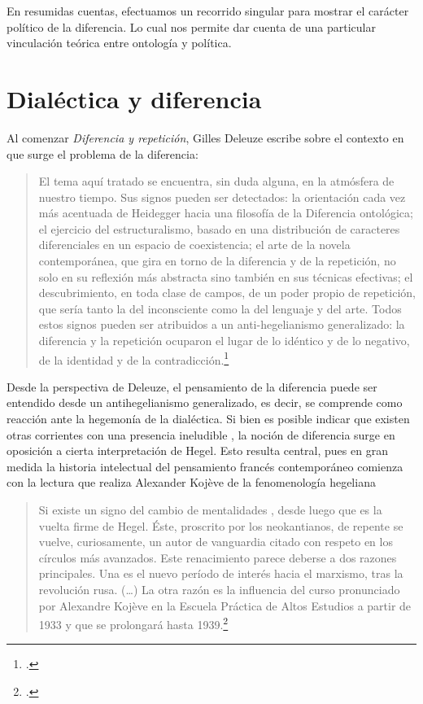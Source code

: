 En resumidas cuentas, efectuamos un recorrido singular para mostrar el carácter político de la diferencia. Lo cual nos permite dar cuenta de una particular vinculación teórica entre ontología y política.


\section{Dialéctica y diferencia}


Al comenzar \emph{Diferencia y repetición}, Gilles Deleuze escribe sobre el contexto en que surge el problema de la diferencia:

\begin{quote}
El tema aquí tratado se encuentra, sin duda alguna, en la atmósfera de nuestro tiempo. Sus signos pueden ser detectados: la orientación cada vez más acentuada de Heidegger hacia una filosofía de la Diferencia ontológica; el ejercicio del estructuralismo, basado en una distribución de caracteres diferenciales en un espacio de coexistencia; el arte de la novela contemporánea, que gira en torno de la diferencia y de la repetición, no solo en su reflexión más abstracta sino también en sus técnicas efectivas; el descubrimiento, en toda clase de campos, de un poder propio de repetición, que sería tanto la del inconsciente como la del lenguaje y del arte. Todos estos signos pueden ser atribuidos a un anti-hegelianismo generalizado: la diferencia y la repetición ocuparon el lugar de lo idéntico y de lo negativo, de la identidad y de la contradicción.\footcite[15]{@6961-DELEUZE2002}
\end{quote}

Desde la perspectiva de Deleuze, el pensamiento de la diferencia puede ser entendido desde un antihegelianismo generalizado, es decir, se comprende como reacción ante la hegemonía de la dialéctica. Si bien es posible indicar que existen otras corrientes con una presencia ineludible , la noción de diferencia surge en oposición a cierta interpretación de Hegel. Esto resulta central, pues en gran medida la historia intelectual del pensamiento francés contemporáneo comienza con la lectura que realiza Alexander Kojève de la fenomenología hegeliana

\begin{quote}
Si existe un signo del cambio de mentalidades , desde luego que es la vuelta firme de Hegel. Éste, proscrito por los neokantianos, de repente se vuelve, curiosamente, un autor de vanguardia citado con respeto en los círculos más avanzados. Este renacimiento parece deberse a dos razones principales. Una es el nuevo período de interés hacia el marxismo, tras la revolución rusa. (\ldots) La otra razón es la influencia del curso pronunciado por Alexandre Kojève en la Escuela Práctica de Altos Estudios a partir de 1933 y que se prolongará hasta 1939.\footcite[28]{@6962-DESCOMBES1998}
\end{quote}

